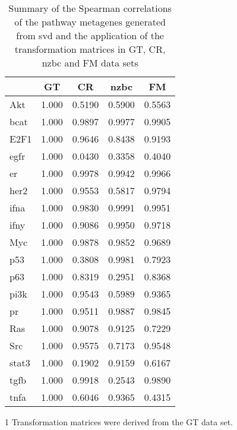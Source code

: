 \begin{table}[htpb]
	\centering
	\begin{threeparttable}
	\caption{Summary of the Spearman correlations of the pathway metagenes generated from \gls{svd} and the application of the transformation matrices in GT, CR, \gls{nzbc} and FM data sets}
	\label{tab:svd_vs_tm_path}
		\begin{tabular}{lcccc}
			& GT & CR & \gls{nzbc} & FM\\
			\hline
			\hline
			\rule{0pt}{2.25ex}Akt & 1.000 & 0.5190 & 0.5900 & 0.5563 \\
			\gls{bcat}            & 1.000 & 0.9897 & 0.9977 & 0.9905 \\
			E2F1                  & 1.000 & 0.9646 & 0.8438 & 0.9193 \\
			\gls{egfr}            & 1.000 & 0.0430 & 0.3358 & 0.4040 \\
			\gls{er}              & 1.000 & 0.9978 & 0.9942 & 0.9966 \\
			\gls{her2}            & 1.000 & 0.9553 & 0.5817 & 0.9794 \\
			\gls{ifna}            & 1.000 & 0.9830 & 0.9991 & 0.9951 \\
			\gls{ifny}            & 1.000 & 0.9086 & 0.9950 & 0.9718 \\
			Myc                   & 1.000 & 0.9878 & 0.9852 & 0.9689 \\
			p53                   & 1.000 & 0.3808 & 0.9981 & 0.7923 \\
			p63                   & 1.000 & 0.8319 & 0.2951 & 0.8368 \\
			\gls{pi3k}            & 1.000 & 0.9543 & 0.5989 & 0.9365 \\
			\gls{pr}              & 1.000 & 0.9511 & 0.9887 & 0.9845 \\
			Ras                   & 1.000 & 0.9078 & 0.9125 & 0.7229 \\
			Src                   & 1.000 & 0.9575 & 0.7173 & 0.9548 \\
			\gls{stat3}           & 1.000 & 0.1902 & 0.9159 & 0.6167 \\
			\gls{tgfb}            & 1.000 & 0.9918 & 0.2543 & 0.9890 \\
			\gls{tnfa}            & 1.000 & 0.6046 & 0.9365 & 0.4315 \\
			\hline
			\hline
		\end{tabular}
		\begin{tablenotes}
			\begin{footnotesize}
				\item [1] Transformation matrices were derived from the GT data set.
			\end{footnotesize}
		\end{tablenotes}
	\end{threeparttable}
\end{table}

